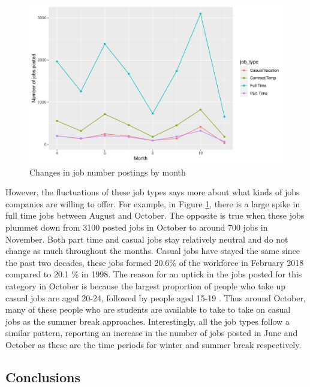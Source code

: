 \documentclass[11pt,a4paper,]{article}
\begin{document}
\begin{figure}

{\centering \includegraphics{Team_JHDP_Assignment4_files/figure-latex/job-count-fluctuations-1} 

}

\caption{Changes in job number postings by month}\label{fig:job-count-fluctuations}
\end{figure}

However, the fluctuations of these job types says more about what kinds of jobs companies are willing to offer. For example, in Figure \ref{fig:job-count-fluctuations}, there is a large spike in full time jobs between August and October. The opposite is true when these jobs plummet down from 3100 posted jobs in October to around 700 jobs in November. Both part time and casual jobs stay relatively neutral and do not change as much throughout the months. Casual jobs have stayed the same since the past two decades, these jobs formed 20.6\% of the workforce in February 2018 compared to 20.1 \% in 1998. The reason for an uptick in the jobs posted for this category in October is because the largest proportion of people who take up casual jobs are aged 20-24, followed by people aged 15-19 \textcite{norman}. Thus around October, many of these people who are students are available to take to take on casual jobs as the summer break approaches. Interestingly, all the job types follow a similar pattern, reporting an increase in the number of jobs posted in June and October as these are the time periods for winter and summer break respectively.

\hypertarget{conclusions}{%
\subsection{Conclusions}\label{conclusions}}
\end{document}
